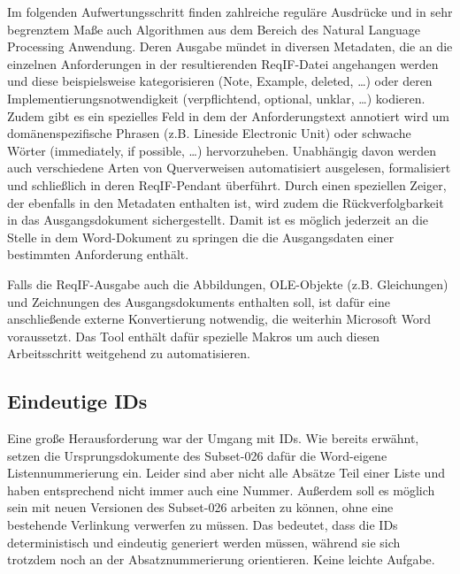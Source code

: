 \documentclass[twoside]{article}
\begin{document}
\begin{multicols}{2}
Im folgenden Aufwertungsschritt finden zahlreiche reguläre Ausdrücke und in sehr begrenztem Maße auch Algorithmen aus dem Bereich des Natural Language Processing Anwendung. Deren Ausgabe mündet in diversen Metadaten, die an die einzelnen Anforderungen in der resultierenden ReqIF-Datei angehangen werden und diese beispielsweise kategorisieren (Note, Example, deleted, \ldots ) oder deren Implementierungsnotwendigkeit (verpflichtend, optional, unklar, \ldots ) kodieren. Zudem gibt es ein spezielles Feld in dem der Anforderungstext annotiert wird um domänenspezifische Phrasen (z.B. \glqq Lineside Electronic Unit\grqq ) oder schwache Wörter (\glqq{}immediately\grqq{}, \glqq{}if possible\grqq{}, \ldots{}) hervorzuheben. Unabhängig davon werden auch verschiedene Arten von Querverweisen automatisiert ausgelesen, formalisiert und schließlich in deren ReqIF-Pendant überführt. Durch einen speziellen Zeiger, der ebenfalls in den Metadaten enthalten ist, wird zudem die Rückverfolgbarkeit in das Ausgangsdokument sichergestellt. Damit ist es möglich jederzeit an die Stelle in dem Word-Dokument zu springen die die Ausgangsdaten einer bestimmten Anforderung enthält.

Falls die ReqIF-Ausgabe auch die Abbildungen, OLE-Objekte (z.B. Gleichungen) und Zeichnungen des Ausgangsdokuments enthalten soll, ist dafür eine anschließende externe Konvertierung notwendig, die weiterhin Microsoft Word voraussetzt. Das Tool enthält dafür spezielle Makros um auch diesen Arbeitsschritt weitgehend zu automatisieren.


\subsection{Eindeutige IDs}
\label{sec:ids}

Eine große Herausforderung war der Umgang mit IDs. Wie bereits erwähnt, setzen die Ursprungsdokumente des Subset-026 dafür die Word-eigene Listennummerierung ein. Leider sind aber nicht alle Absätze Teil einer Liste und haben entsprechend nicht immer auch eine Nummer. Außerdem soll es möglich sein mit neuen Versionen des Subset-026 arbeiten zu können, ohne eine bestehende Verlinkung verwerfen zu müssen. Das bedeutet, dass die IDs deterministisch und eindeutig generiert werden müssen, während sie sich trotzdem noch an der Absatznummerierung orientieren.  Keine leichte Aufgabe.


\end{multicols}
\end{document}
